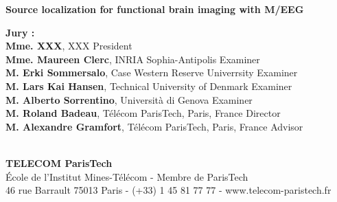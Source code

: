 \documentclass[12pt,a4paper,english]{MastersDoctoralThesis}
\begin{document}
\begin{center}
%
%
%
\vspace{1.cm}%
%
%
%
\begin{spacing}{3.0}
\textcolor[RGB]{191,18,56}{
\noindent
{\Huge{\bf Source localization for functional \hspace{0.5cm} brain imaging with M/EEG}}\\
}
\end{spacing}
%
%
\vspace{2.cm}%
%
%
%
\end{center}
%
%
%
\vspace{-1.2cm}
%
%
%
\flushleft
\hspace{-1.7cm}
\begin{minipage}{1.05\textwidth}	%
{\bf Jury :}\vspace{0.2cm}\\
{\bf Mme. XXX}, {\small XXX}
\hfill President\vspace{0.2cm}\\
{\bf Mme. Maureen Clerc}, {\small INRIA Sophia-Antipolis}
\hfill Examiner\\
{\bf M. Erki Sommersalo}, {\small Case Western Reserve Univerrsity}
\hfill Examiner\\%
{\bf M. Lars Kai Hansen}, {\small Technical University of Denmark}
\hfill Examiner\\
{\bf M. Alberto Sorrentino}, {\small Università di Genova}
\hfill Examiner\vspace{0.2cm}\\
{\bf M. Roland Badeau}, {\small T\'el\'ecom ParisTech, Paris, France}
\hfill Director\\
{\bf M. Alexandre Gramfort}, {\small T\'el\'ecom ParisTech, Paris, France}
\hfill Advisor\\
\end{minipage}\\
%
%
%
\vspace{.8cm}
%
%
%
\centering
{\bf TELECOM ParisTech}\\
{\small École de l'Institut Mines-Télécom - Membre de ParisTech}\\
{\tiny 46 rue Barrault 75013 Paris - (+33) 1 45 81 77 77 - www.telecom-paristech.fr}
%
%
%
\newpage
\end{document}
